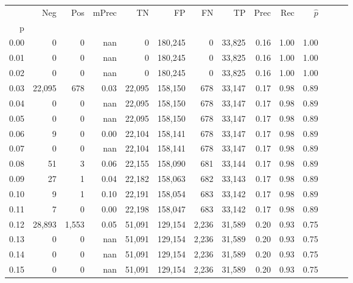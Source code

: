 \begin{tabular}{rrrrrrrrrrrrrr}
\toprule
{} &     Neg &    Pos & mPrec &       TN &       FP &      FN &      TP &  Prec &   Rec & $\hat{p}$ \\
p    &         &        &       &          &          &         &         &       &       &           \\
\midrule
0.00 &       0 &      0 &   nan &        0 &  180,245 &       0 &  33,825 &  0.16 &  1.00 &      1.00 \\
0.01 &       0 &      0 &   nan &        0 &  180,245 &       0 &  33,825 &  0.16 &  1.00 &      1.00 \\
0.02 &       0 &      0 &   nan &        0 &  180,245 &       0 &  33,825 &  0.16 &  1.00 &      1.00 \\
0.03 &  22,095 &    678 &  0.03 &   22,095 &  158,150 &     678 &  33,147 &  0.17 &  0.98 &      0.89 \\
0.04 &       0 &      0 &   nan &   22,095 &  158,150 &     678 &  33,147 &  0.17 &  0.98 &      0.89 \\
0.05 &       0 &      0 &   nan &   22,095 &  158,150 &     678 &  33,147 &  0.17 &  0.98 &      0.89 \\
0.06 &       9 &      0 &  0.00 &   22,104 &  158,141 &     678 &  33,147 &  0.17 &  0.98 &      0.89 \\
0.07 &       0 &      0 &   nan &   22,104 &  158,141 &     678 &  33,147 &  0.17 &  0.98 &      0.89 \\
0.08 &      51 &      3 &  0.06 &   22,155 &  158,090 &     681 &  33,144 &  0.17 &  0.98 &      0.89 \\
0.09 &      27 &      1 &  0.04 &   22,182 &  158,063 &     682 &  33,143 &  0.17 &  0.98 &      0.89 \\
0.10 &       9 &      1 &  0.10 &   22,191 &  158,054 &     683 &  33,142 &  0.17 &  0.98 &      0.89 \\
0.11 &       7 &      0 &  0.00 &   22,198 &  158,047 &     683 &  33,142 &  0.17 &  0.98 &      0.89 \\
0.12 &  28,893 &  1,553 &  0.05 &   51,091 &  129,154 &   2,236 &  31,589 &  0.20 &  0.93 &      0.75 \\
0.13 &       0 &      0 &   nan &   51,091 &  129,154 &   2,236 &  31,589 &  0.20 &  0.93 &      0.75 \\
0.14 &       0 &      0 &   nan &   51,091 &  129,154 &   2,236 &  31,589 &  0.20 &  0.93 &      0.75 \\
0.15 &       0 &      0 &   nan &   51,091 &  129,154 &   2,236 &  31,589 &  0.20 &  0.93 &      0.75 \\

\end{tabular}
